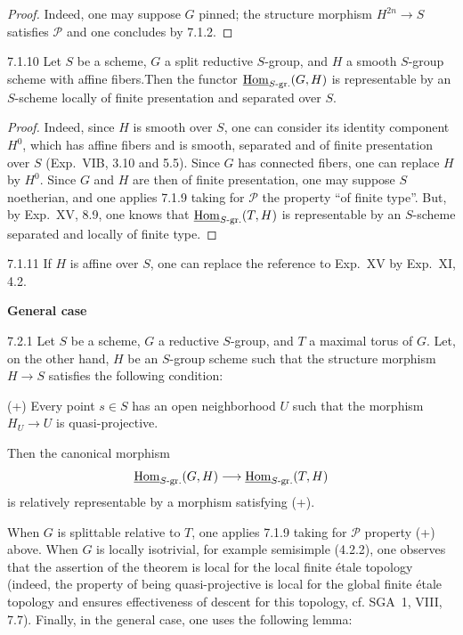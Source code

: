 \begin{proof}
Indeed, one may suppose $G$ pinned; the structure morphism $H^{2n}\to S$ satisfies $\mathscr P$ and one concludes by 7.1.2.
\end{proof}
\begin{corollary}{7.1.10}\label{XXIV.7.1.10}
Let $S$ be a scheme, $G$ a split reductive $S$-group, and $H$ a smooth $S$-group scheme with affine fibers.Then the functor $\underline{\operatorname{Hom}}_{S\text{-gr.}}(G,H)$ is representable by an $S$-scheme locally of finite presentation and separated over $S$.
\end{corollary}
\begin{proof}
Indeed, since $H$ is smooth over $S$, one can consider its identity component $H^0$, which has affine fibers and is smooth, separated and of finite presentation over $S$ (Exp.~VIB, 3.10 and 5.5). Since $G$ has connected fibers, one can replace $H$ by $H^0$. Since $G$ and $H$ are then of finite presentation, one may suppose $S$ noetherian, and one applies 7.1.9 taking for $\mathscr P$ the property ``of finite type''. But, by Exp.~XV, 8.9, one knows that $\underline{\operatorname{Hom}}_{S\text{-gr.}}(T,H)$ is representable by an $S$-scheme separated and locally of finite type.
\end{proof}
\begin{remark}{7.1.11}\label{XXIV.7.1.11}
If $H$ is affine over $S$, one can replace the reference to Exp.~XV by Exp.~XI, 4.2.
\end{remark}
\label{XXIV.7.2}\textbf{General case}
\begin{proposition}{7.2.1}\label{XXIV.7.2.1}
Let $S$ be a scheme, $G$ a reductive $S$-group, and $T$ a maximal torus of $G$. Let, on the other hand, $H$ be an $S$-group scheme such that the structure morphism $H\to S$ satisfies the following condition:

(+) Every point $s\in S$ has an open neighborhood $U$ such that the morphism $H_U\to U$ is quasi-projective.

Then the canonical morphism
\[
\underline{\operatorname{Hom}}_{S\text{-gr.}}(G,H)\longrightarrow\underline{\operatorname{Hom}}_{S\text{-gr.}}(T,H)
\]
is relatively representable by a morphism satisfying (+).
\end{proposition}
When $G$ is splittable relative to $T$, one applies 7.1.9 taking for $\mathscr P$ property (+) above. When $G$ is locally isotrivial, for example semisimple (4.2.2), one observes that the assertion of the theorem is local for the local finite étale topology (indeed, the property of being quasi-projective is local for the global finite étale topology and ensures effectiveness of descent for this topology, cf. SGA~1, VIII, 7.7). Finally, in the general case, one uses the following lemma:
